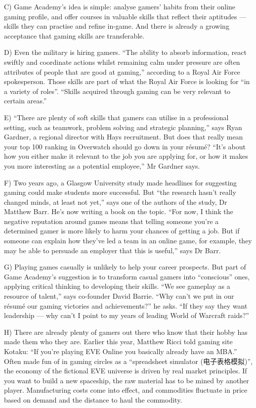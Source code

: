 \documentclass[UTF8,11pt]{ctexart}
\begin{document}
C) Game Academy’s idea is simple: analyse gamers’ habits from their online gaming profile, and offer courses in valuable skills that reflect their aptitudes — skills they can practise and refine in-game. And there is already a growing acceptance that gaming skills are transferable.


D) Even the military is hiring gamers. “The ability to absorb information, react swiftly and coordinate actions whilst remaining calm under pressure are often attributes of people that are good at gaming,” according to a Royal Air Force spokesperson. Those skills are part of what the Royal Air Force is looking for “in a variety of roles”. “Skills acquired through gaming can be very relevant to certain areas.”


E) “There are plenty of soft skills that gamers can utilise in a professional setting, such as teamwork, problem solving and strategic planning,” says Ryan Gardner, a regional director with Hays recruitment. But does that really mean your top 100 ranking in Overwatch should go down in your résumé? “It’s about how you either make it relevant to the job you are applying for, or how it makes you more interesting as a potential employee,” Mr Gardner says.


F) Two years ago, a Glasgow University study made headlines for suggesting gaming could make students more successful. But “the research hasn’t really changed minds, at least not yet,” says one of the authors of the study, Dr Matthew Barr. He’s now writing a book on the topic. “For now, I think the negative reputation around games means that telling someone you’re a determined gamer is more likely to harm your chances of getting a job. But if someone can explain how they’ve led a team in an online game, for example, they may be able to persuade an employer that this is useful,” says Dr Barr.


G) Playing games casually is unlikely to help your career prospects. But part of Game Academy’s suggestion is to transform casual gamers into “conscious” ones, applying critical thinking to developing their skills. “We see gameplay as a resource of talent,” says co-founder David Barrie. “Why can’t we put in our résumé our gaming victories and achievements?” he asks. “If they say they want leadership — why can’t I point to my years of leading World of Warcraft raids?”


H) There are already plenty of gamers out there who know that their hobby has made them who they are. Earlier this year, Matthew Ricci told gaming site Kotaku: “If you’re playing EVE Online you basically already have an MBA.” Often made fun of in gaming circles as a “spreadsheet simulator (电子表格模拟)”, the economy of the fictional EVE universe is driven by real market principles. If you want to build a new spaceship, the raw material has to be mined by another player. Manufacturing costs come into effect, and commodities fluctuate in price based on demand and the distance to haul the commodity.
\end{document}
